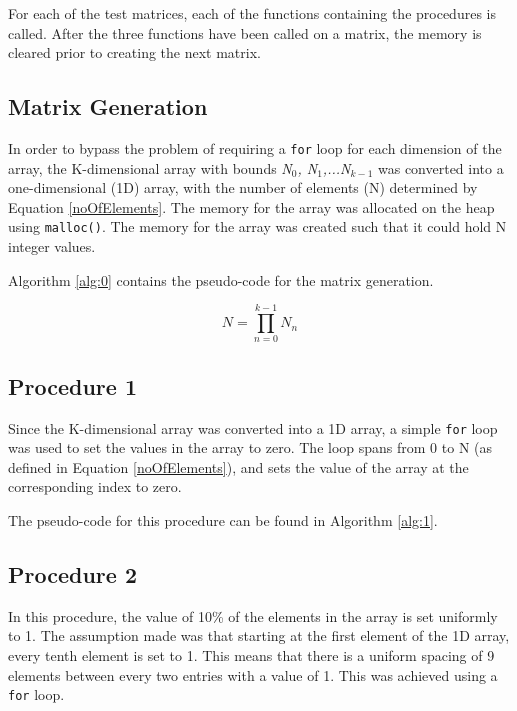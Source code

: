 \documentclass[10pt,twocolumn]{witseiepaper}
\begin{document}
For each of the test matrices, each of the functions containing the procedures is called. After the three functions have been called on a matrix, the memory is cleared prior to creating the next matrix.

\subsection{Matrix Generation}
In order to bypass the problem of requiring a \texttt{for} loop for each dimension of the array, the K-dimensional array with bounds \textit{N$_0$, N$_1$,...N$_{k-1}$} was converted into a one-dimensional (1D) array, with the number of elements (N) determined by Equation \ref{noOfElements}. The memory for the array was allocated on the heap using \texttt{malloc()}. The memory for the array was created such that it could hold N integer values.

Algorithm \ref{alg:0} contains the pseudo-code for the matrix generation.

\begin{equation}
N = \prod_{n=0}^{k-1}N_{n}
\label{noOfElements}
\end{equation}

\subsection{Procedure 1}
Since the K-dimensional array was converted into a 1D array, a simple \texttt{for} loop was used to set the values in the array to zero. The loop spans from 0 to N (as defined in Equation \ref{noOfElements}), and sets the value of the array at the corresponding index to zero. 

The pseudo-code for this procedure can be found in Algorithm \ref{alg:1}.

\subsection{Procedure 2}
In this procedure, the value of 10\% of the elements in the array is set uniformly to 1. The assumption made was that starting at the first element of the 1D array, every tenth element is set to 1. This means that there is a uniform spacing of 9 elements between every two entries with a value of 1. This was achieved using a \texttt{for} loop. 
\end{document}
